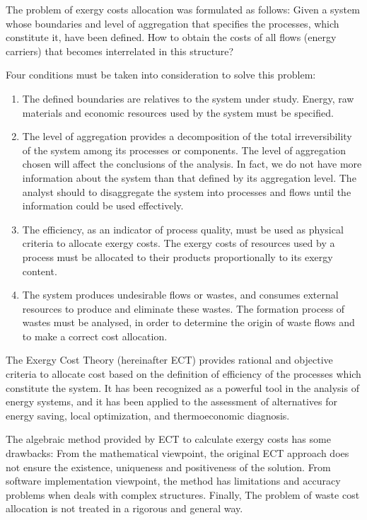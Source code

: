 \documentclass[preprint,12pt,times]{elsarticle}
\begin{document}
The problem of exergy costs allocation was formulated \cite{Valero1986,ECT93} as follows: Given a system whose boundaries and level of aggregation that specifies the processes, which constitute it, have been defined. How to obtain the costs of all flows (energy carriers) that becomes interrelated in this structure?

Four conditions must be taken into consideration to solve this problem:
\begin{enumerate}
	\item The defined boundaries are relatives to the system under study. Energy, raw materials and economic resources used by the system must be specified.
	\item The level of aggregation provides a decomposition of the total irreversibility of the system among its processes or components. The level of aggregation chosen will affect the conclusions of the analysis. In fact, we do not have more information about the system than that defined by its aggregation level. The analyst should to disaggregate the system into processes and flows until the information could be used effectively. 
	\item The efficiency, as an indicator of process quality, must be used as physical criteria to allocate exergy costs. The exergy costs of resources used by a process must be allocated to their products proportionally to its exergy content. 
	\item The system produces undesirable flows or wastes, and consumes external resources to produce and eliminate these wastes. The formation process of wastes must be analysed, in order to determine the origin of waste flows and to make a correct cost allocation. 
\end{enumerate}

The Exergy Cost Theory \cite{ECT93} (hereinafter ECT) provides rational and objective criteria to allocate cost based on the definition of efficiency of the processes which constitute the system. It has been recognized as a powerful tool in the analysis of energy systems, and it has been applied to the assessment of alternatives for energy saving, local optimization, and thermoeconomic diagnosis.

The algebraic method provided by ECT to calculate exergy costs has some drawbacks: From the mathematical viewpoint, the original ECT approach does not ensure the existence, uniqueness and positiveness of the solution. From software implementation viewpoint, the method has limitations and accuracy problems when deals with complex structures. Finally, The problem of waste cost allocation is not treated in a rigorous and general way.
\end{document}

